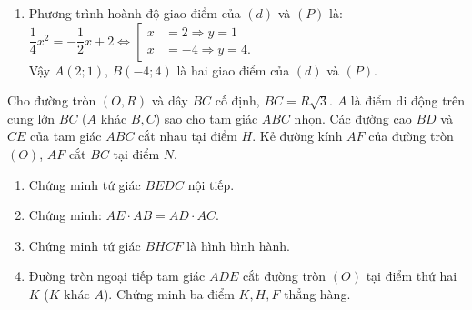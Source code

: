 \begin{ex}
{\begin{enumerate}
\begin{center}
\begin{tikzpicture}[>=stealth]
  \end{tikzpicture}
\end{center}
		\item Phương trình hoành độ giao điểm của $ (d) $ và $ (P) $ là: $ \dfrac{1}{4}x^2 = -\dfrac{1}{2}x + 2 \Leftrightarrow \left[\begin{aligned} x & =2 \Rightarrow y = 1\\ x &=-4 \Rightarrow y =4. \end{aligned}\right. $\\
		Vậy $ A(2;1) $, $ B(-4;4) $ là hai giao điểm của $ (d) $ và $ (P) $.
	\end{enumerate}
}
 \begin{ex}%
 	Cho đường tròn $ (O,R) $ và dây $ BC $ cố định, $ BC = R\sqrt3 $. $ A $ là điểm di động trên cung lớn $ BC $ ($ A $ khác $ B,C $) sao cho tam giác $ ABC $ nhọn. Các đường cao $ BD $ và $ CE $ của tam giác $ ABC $ cắt nhau tại điểm $ H $. Kẻ đường kính $ AF $ của đường tròn $ (O) $, $ AF $ cắt $ BC $ tại điểm $ N $.
 	\begin{enumerate}
 		\item Chứng minh tứ giác $ BEDC $ nội tiếp.
 		\item Chứng minh: $ AE\cdot AB = AD\cdot AC. $
 		\item Chứng minh tứ giác $ BHCF $ là hình bình hành.
 		\item Đường tròn ngoại tiếp tam giác $ ADE $ cắt đường tròn $ (O) $ tại điểm thứ hai $ K $ ($ K $ khác $ A $). Chứng minh ba điểm $ K, H, F $ thẳng hàng.
 	\end{enumerate}
 	\end{ex}
\end{ex}
